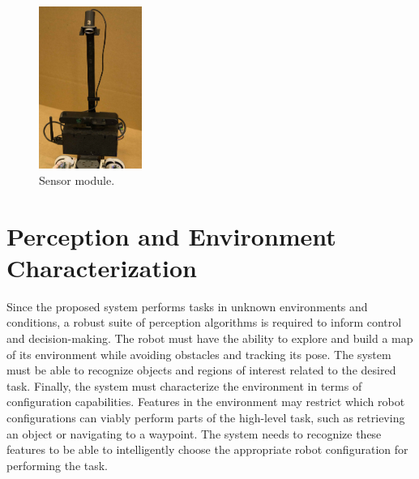 \documentclass[conference]{IEEEtran}
\begin{document}
\begin{figure}
\begin{center}
\includegraphics[width=0.3\textwidth]{images/sensor_module.jpg}
\caption{Sensor module.}
\label{fig:sensor-module}
\end{center}
\end{figure}

%
%

\section{Perception and Environment Characterization}
\label{sec:perception-and-env-characterization}
%
Since the proposed system performs tasks in unknown environments and conditions, a robust suite of perception algorithms is required to inform control and decision-making. The robot must have the ability to explore and build a map of its environment while avoiding obstacles and tracking its pose. The system must be able to recognize objects and regions of interest related to the desired task. Finally, the system must characterize the environment in terms of configuration capabilities. Features in the environment may restrict which robot configurations can viably perform parts of the high-level task, such as retrieving an object or navigating to a waypoint. The system needs to recognize these features to be able to intelligently choose the appropriate robot configuration for performing the task.
\end{document}
